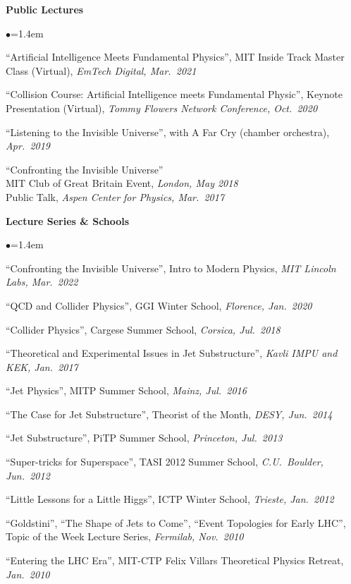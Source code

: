 \documentclass[11pt]{article}
\newcommand{\sh}{\phantom{.....}}
\newcommand{\bbl}{\begin{list}{$\bullet$}{\leftmargin=1.4em \itemsep=-1pt}}
\newcommand{\el}{\end{list}}
\begin{document}

\noindent \textbf{Public Lectures}


\bbl
\item ``Artificial Intelligence Meets Fundamental Physics'', MIT Inside Track Master Class (Virtual), \textit{EmTech Digital, Mar.~2021}
\item ``Collision Course: Artificial Intelligence meets Fundamental Physic'', Keynote Presentation (Virtual), \textit{Tommy Flowers Network Conference, Oct.~2020}
\item ``Listening to the Invisible Universe'', with A Far Cry (chamber orchestra), \textit{Apr.~2019}
\item ``Confronting the Invisible Universe''
\\ \sh MIT Club of Great Britain Event, \textit{London, May 2018}
\\ \sh Public Talk, \textit{Aspen Center for Physics, Mar.~2017}
\el 


\noindent \textbf{Lecture Series \& Schools}

\bbl
\item ``Confronting the Invisible Universe'', Intro to Modern Physics, \textit{MIT Lincoln Labs, Mar.~2022}
\item ``QCD and Collider Physics'', GGI Winter School, \textit{Florence, Jan.~2020}
\item ``Collider Physics'', Cargese Summer School, \textit{Corsica, Jul.~2018}
\item ``Theoretical and Experimental Issues in Jet Substructure'', \textit{Kavli IMPU and KEK, Jan.~2017}
\item ``Jet Physics'', MITP Summer School, \textit{Mainz, Jul.~2016} 
\item ``The Case for Jet Substructure'', Theorist of the Month, \textit{DESY, Jun.~2014}
\item ``Jet Substructure'', PiTP Summer School, \textit{Princeton, Jul.~2013}
\item ``Super-tricks for Superspace'', TASI 2012 Summer School, \textit{C.U.~Boulder, Jun.~2012}
\item ``Little Lessons for a Little Higgs'', ICTP Winter School, \textit{Trieste, Jan.~2012}
\item ``Goldstini'', ``The Shape of Jets to Come'', ``Event Topologies for Early LHC'', Topic of the Week Lecture Series, \textit{Fermilab, Nov.~2010}
\item ``Entering the LHC Era'', MIT-CTP Felix Villars Theoretical Physics Retreat, \textit{Jan.~2010}
\el
\end{document}
